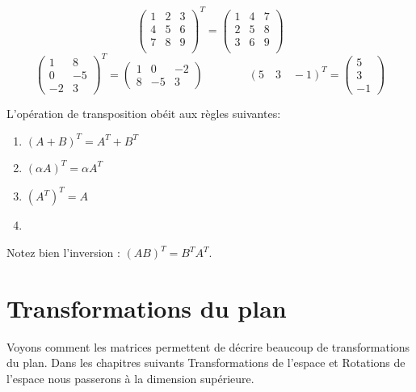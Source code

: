 \documentclass[11pt,class=report,crop=false]{standalone}
\begin{document}
\begin{exemple}
	
	$$
	\begin{pmatrix}
		1&2&3\\
		4&5&6\\
		7&8&9\\
	\end{pmatrix}^T
	=
	\begin{pmatrix}
		1&4&7\\
		2&5&8\\
		3&6&9\\
	\end{pmatrix}$$
	$$\begin{pmatrix}
		1 & 8\\
		0 & -5\\
		-2 & 3
	\end{pmatrix}^T=
	\begin{pmatrix}
		1 & 0 & -2\\
		8 &-5 & 3
	\end{pmatrix}
	\qquad\qquad
	(5\quad 3\quad -1)^T  =
	\begin{pmatrix}
		5 \\
		3\\
		-1
	\end{pmatrix}
	$$
\end{exemple}

L'opération de transposition obéit aux règles suivantes:
	\begin{enumerate}
		\item $(A + B)^T = A^T + B^T$
		\item $(\alpha A)^T = \alpha A^T $
		\item $(A^T)^T = A$
		\item {}
	\end{enumerate}

Notez bien l'inversion : $(AB)^T = B^T A^T$.




\section{Transformations du plan}

Voyons comment les matrices permettent de décrire beaucoup de transformations du plan.
Dans les chapitres suivants \og{}Transformations de l'espace\fg{} et \og{}Rotations de l'espace\fg{} nous passerons à la dimension supérieure.
\end{document}
